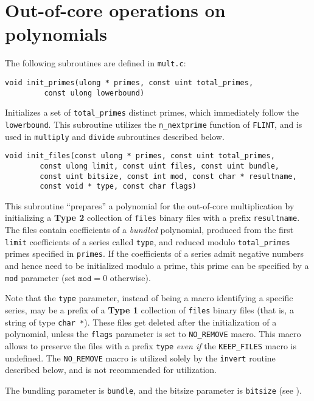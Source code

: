 \documentclass[a4paper,10pt]{article}
\newcommand{\code}{\lstinline}
\begin{document}
\section{Out-of-core operations on polynomials} \label{sec:out-of-core}

The following subroutines are defined in \code{mult.c}:

\begin{lstlisting}
void init_primes(ulong * primes, const uint total_primes,
		 const ulong lowerbound)
\end{lstlisting}

Initializes a set of \code{total_primes} distinct primes, which immediately follow the \code{lowerbound}. This subroutine utilizes the \code{n_nextprime} function of \code{FLINT}, and is used in \code{multiply} and \code{divide} subroutines described below.

\begin{lstlisting}
void init_files(const ulong * primes, const uint total_primes,
		const ulong limit, const uint files, const uint bundle,
		const uint bitsize, const int mod, const char * resultname,
		const void * type, const char flags)
\end{lstlisting}

This subroutine ``prepares'' a polynomial for the out-of-core multiplication by initializing a \textbf{Type 2} collection of \code{files} binary files with a prefix \code{resultname}. The files contain coefficients of a \emph{bundled} polynomial, produced from the first \code{limit} coefficients of a series called \code{type}, and reduced modulo \code{total_primes} primes specified in \code{primes}. If the coefficients of a series admit negative numbers and hence need to be initialized modulo a prime, this prime can be specified by a \code{mod} parameter (set $\texttt{mod} = 0$ otherwise).

Note that the \code{type} parameter, instead of being a macro identifying a specific series, may be a prefix of a \textbf{Type 1} collection of \code{files} binary files (that is, a string of type \code{char *}). These files get deleted after the initialization of a polynomial, unless the \code{flags} parameter is set to \code{NO_REMOVE} macro. This macro allows to preserve the files with a prefix \code{type} \emph{even if} the \code{KEEP_FILES} macro is undefined. The \code{NO_REMOVE} macro is utilized solely by the \code{invert} routine described below, and is not recommended for utilization.

The bundling parameter is \code{bundle}, and the bitsize parameter is \code{bitsize} (see \cite[Section 4.1]{mosunov}).
\end{document}
